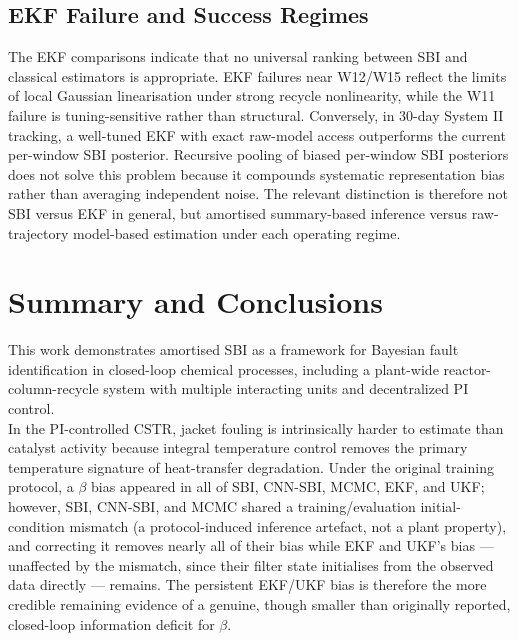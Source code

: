 \documentclass[aps,pre,twocolumn,superscriptaddress,floatfix]{revtex4-2}
\begin{document}
\subsection{EKF Failure and Success Regimes}
\label{sec:disc_ekf_regimes}

The EKF comparisons indicate that no universal ranking between SBI and classical 
estimators is appropriate. EKF failures near W12/W15 reflect the limits of local 
Gaussian linearisation under strong recycle nonlinearity, while the W11 failure is 
tuning-sensitive rather than structural. Conversely, in 30-day System II tracking, a 
well-tuned EKF with exact raw-model access outperforms the current per-window SBI 
posterior. Recursive pooling of biased per-window SBI posteriors does not solve this 
problem because it compounds systematic representation bias rather than averaging 
independent noise. The relevant distinction is therefore not SBI versus EKF in 
general, but amortised summary-based inference versus raw-trajectory model-based
estimation under each operating regime.

\section{Summary and Conclusions}
\label{sec:conclusions}


This work demonstrates amortised SBI as a framework for Bayesian fault identification
in closed-loop chemical processes, including a plant-wide reactor-column-recycle system
with multiple interacting units and decentralized PI control.\\
In the PI-controlled CSTR, jacket fouling is intrinsically harder to estimate than catalyst
activity because integral temperature control removes the primary temperature signature
of heat-transfer degradation. Under the original training protocol, a $\beta$ bias
appeared in all of SBI, CNN-SBI, MCMC, EKF, and UKF; however, SBI, CNN-SBI, and MCMC
shared a training/evaluation initial-condition mismatch (a protocol-induced inference
artefact, not a plant property), and correcting it removes nearly all of their bias
while EKF and UKF's bias --- unaffected by the mismatch, since their filter state initialises
from the observed data directly --- remains. The persistent EKF/UKF bias is therefore
the more credible remaining evidence of a genuine, though smaller than originally reported, 
closed-loop information deficit for $\beta$.
\end{document}
